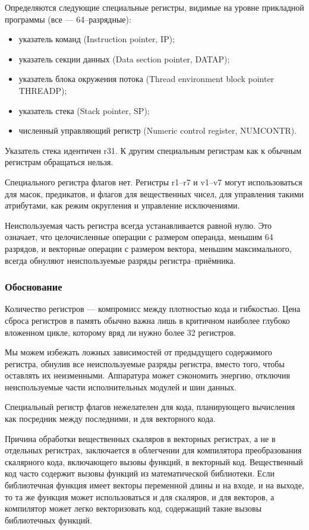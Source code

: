 \documentclass[forwardcom.tex]{subfiles}
\begin{document}
Определяются следующие специальные регистры, видимые на уровне прикладной программы (все --- 64--разрядные):
\begin{itemize}
\item указатель команд (Instruction pointer, IP);
\item указатель секции данных (Data section pointer, DATAP);
\item указатель блока окружения потока (Thread environment block pointer THREADP);
\item указатель стека (Stack pointer, SP);
\item численный управляющий регистр (Numeric control register, NUMCONTR).
\end{itemize}

Указатель стека идентичен r31. К другим специальным регистрам как к обычным регистрам обращаться нельзя.

Специального регистра флагов нет. Регистры r1--r7 и v1--v7 могут использоваться для масок, предикатов, и флагов для вещественных чисел, для управления такими атрибутами, как режим округления и управление исключениями.

Неиспользуемая часть регистра всегда устанавливается равной нулю. Это означает, что целочисленные операции с размером операнда, меньшим 64 разрядов, и векторные операции с размером вектора, меньшим максимального, всегда обнуляют неиспользуемые разряды регистра--приёмника.

\subsubsection{Обоснование}
Количество регистров --- компромисс между плотностью кода и гибкостью. Цена сброса регистров в память обычно важна лишь в критичном наиболее глубоко вложенном цикле, которому вряд ли нужно более 32 регистров.

Мы можем избежать ложных зависимостей от предыдущего содержимого регистра, обнулив все неиспользуемые разряды регистра, вместо того, чтобы оставлять их неизменными. Аппаратура может сэкономить энергию, отключив неиспользуемые части исполнительных модулей и шин данных.

Специальный регистр флагов нежелателен для кода, планирующего вычисления как посредник между последними, и для векторного кода.

Причина обработки вещественных скаляров в векторных регистрах, а не в отдельных регистрах, заключается в облегчении для компилятора преобразования скалярного кода, включающего вызовы функций, в векторный код. Вещественный код часто содержит вызовы функций из математической библиотеки. Если библиотечная функция имеет векторы переменной длины и на входе, и на выходе, то та же функция может использоваться и для скаляров, и для векторов, а компилятор может легко векторизовать код, содержащий такие вызовы библиотечных функций.
\end{document}
